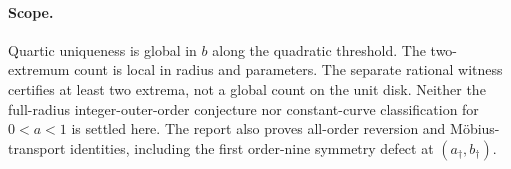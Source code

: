 \paragraph{Scope.}
Quartic uniqueness is global in $b$ along the quadratic threshold.
The two-extremum count is local in radius and parameters. The separate
rational witness certifies at least two extrema, not a global count on the
unit disk. Neither the full-radius integer-outer-order conjecture nor
constant-curve classification for $0<a<1$ is settled here. The report also
proves all-order reversion and M\"obius-transport identities, including the
first order-nine symmetry defect at $(a_\dagger,b_\dagger)$.
